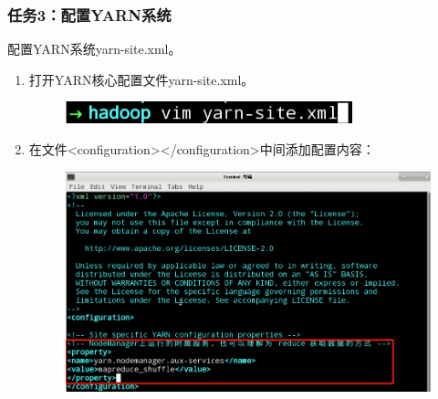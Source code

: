 \documentclass {article}
\begin{document}
			\subsubsection{任务3：配置YARN系统}
				配置YARN系统yarn-site.xml。
				\begin{enumerate}
					\item 打开YARN核心配置文件yarn-site.xml。
					\begin{figure}[H]
						\centering
						\includegraphics{figures/fig38.png}
					\end{figure}
				
					\item 在文件<configuration></configuration>中间添加配置内容：
					\begin{figure}[H]
						\centering
						\includegraphics[width=4.5in]{figures/fig39.png}
					\end{figure}
				\end{enumerate}		
					
\end{document}
